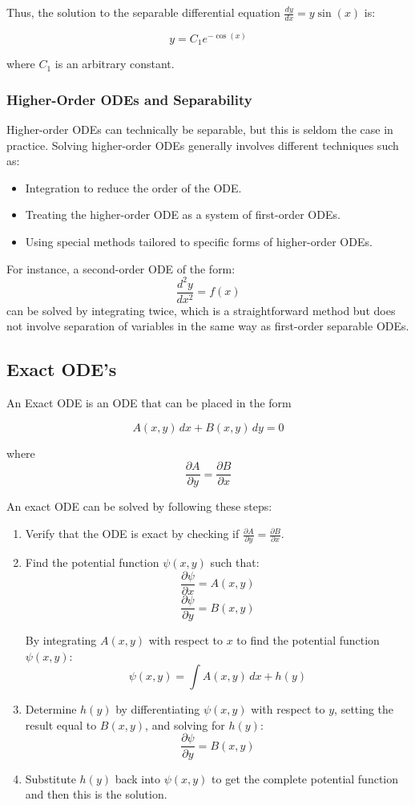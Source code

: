 \documentclass[12pt]{article}
\begin{document}
Thus, the solution to the separable differential equation \(\frac{dy}{dx} = y \sin(x)\) is:

\[ y = C_1 e^{-\cos(x)} \]

where \(C_1\) is an arbitrary constant.
\subsubsection{Higher-Order ODEs and Separability}
Higher-order ODEs can technically be separable, but this is seldom the case in practice. Solving higher-order ODEs generally involves different techniques such as:
\begin{itemize}
\item Integration to reduce the order of the ODE.
\item Treating the higher-order ODE as a system of first-order ODEs.
\item Using special methods tailored to specific forms of higher-order ODEs.
\end{itemize}

For instance, a second-order ODE of the form:
\[\frac{d^2y}{dx^2} = f(x)\]
can be solved by integrating twice, which is a straightforward method but does not involve separation of variables in the same way as first-order separable ODEs.

\subsection{Exact ODE's}
An Exact ODE is an ODE that can be placed in the form

\[A(x,y) \, dx + B(x,y) \, dy = 0\]

where 
\[\frac{\partial A}{\partial y} = \frac{\partial B}{\partial x}\]

An exact ODE can be solved by following these steps:
\begin{enumerate}
\item Verify that the ODE is exact by checking if \(\frac{\partial A}{\partial y} = \frac{\partial B}{\partial x}\).
\item Find the potential function \(\psi(x, y)\) such that:
    \[ \frac{\partial \psi}{\partial x} = A(x, y) \]
    \[ \frac{\partial \psi}{\partial y} = B(x, y) \]

By integrating \(A(x, y)\) with respect to \(x\) to find the potential function \(\psi(x, y)\):
    \[ \psi(x, y) = \int A(x, y) \, dx + h(y) \]
\item Determine \(h(y)\) by differentiating \(\psi(x, y)\) with respect to \(y\), setting the result equal to \(B(x,y)\), and solving for \(h(y)\): 
    \[ \frac{\partial \psi}{\partial y} =  B(x, y) \]
\item Substitute \(h(y)\) back into \(\psi(x, y)\) to get the complete potential function and then this is the solution.
\end{enumerate}
\end{document}
